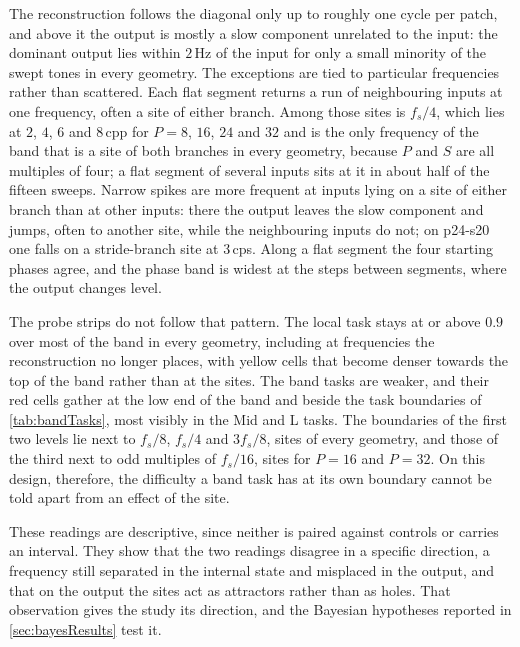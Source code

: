 The reconstruction follows the diagonal only up to roughly one cycle per patch, and above it the output is mostly a slow component unrelated to the input: the dominant output lies within $2$\,Hz of the input for only a small minority of the swept tones in every geometry. The exceptions are tied to particular frequencies rather than scattered. Each flat segment returns a run of neighbouring inputs at one frequency, often a site of either branch. Among those sites is $f_s/4$, which lies at $2$, $4$, $6$ and $8$\,cpp for $P=8$, $16$, $24$ and $32$ and is the only frequency of the band that is a site of both branches in every geometry, because $P$ and $S$ are all multiples of four; a flat segment of several inputs sits at it in about half of the fifteen sweeps. Narrow spikes are more frequent at inputs lying on a site of either branch than at other inputs: there the output leaves the slow component and jumps, often to another site, while the neighbouring inputs do not; on p24-s20 one falls on a stride-branch site at $3$\,cps. Along a flat segment the four starting phases agree, and the phase band is widest at the steps between segments, where the output changes level.

The probe strips do not follow that pattern. The local task stays at or above $0.9$ over most of the band in every geometry, including at frequencies the reconstruction no longer places, with yellow cells that become denser towards the top of the band rather than at the sites. The band tasks are weaker, and their red cells gather at the low end of the band and beside the task boundaries of \autoref{tab:bandTasks}, most visibly in the Mid and L tasks. The boundaries of the first two levels lie next to $f_s/8$, $f_s/4$ and $3f_s/8$, sites of every geometry, and those of the third next to odd multiples of $f_s/16$, sites for $P=16$ and $P=32$. On this design, therefore, the difficulty a band task has at its own boundary cannot be told apart from an effect of the site.

These readings are descriptive, since neither is paired against controls or carries an interval. They show that the two readings disagree in a specific direction, a frequency still separated in the internal state and misplaced in the output, and that on the output the sites act as attractors rather than as holes. That observation gives the study its direction, and the Bayesian hypotheses reported in \autoref{sec:bayesResults} test it.

